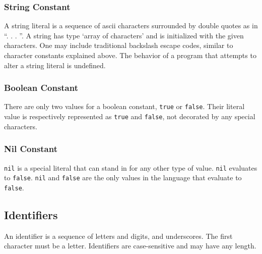 \subsubsection{String Constant}
A string literal is a sequence of ascii characters surrounded by double quotes as in ``. . . ''. A string has type `array of characters' and is initialized with the given characters. One may include traditional backslash escape codes, similar to character constants explained above. The behavior of a program that attempts to alter a string literal is undefined.
\subsubsection{Boolean Constant}
There are only two values for a boolean constant, \verb!true! or \verb!false!. Their literal value is respectively represented as \verb!true! and \verb!false!, not decorated by any special characters.
\subsubsection{Nil Constant}
\verb!nil! is a special literal that can stand in for any other type of value. \verb!nil! evaluates to \verb!false!. \verb!nil! and \verb!false! are the only values in the language that evaluate to \verb!false!.
\subsection{Identifiers}
An identifier is a sequence of letters and digits, and underscores. The first character must be a letter. Identifiers are case-sensitive and may have any length.

